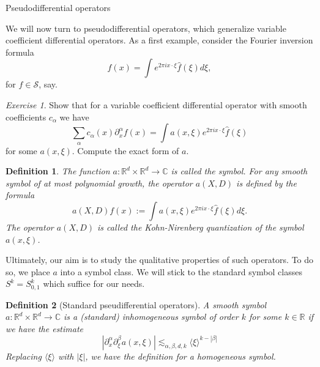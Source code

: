 \documentclass[11pt]{article}
\newtheorem*{defn}{Definition}
\theoremstyle{remark}
\newtheorem{exr}{Exercise}
\newcommand{\calS}{\mathcal{S}}
\newcommand{\1}{\textbf{1}}
\newcommand{\lle}{\lesssim}
\def\brac#1{\langle #1  \rangle}
\newcommand{\bbR}{\mathbb{R}}
\newcommand{\bbC}{\mathbb{C}}
\begin{document}
{\noindent\Large Pseudodifferential operators}
\vspace{6mm}

We will now turn to pseudodifferential operators, which generalize variable coefficient differential operators. As a first example, consider the Fourier inversion formula
\[
f(x) = \int e^{2 \pi i x \cdot \xi} \hat{f}(\xi) d\xi,
\]
for $f \in \calS$, say.
\begin{exr}
Show that for a variable coefficient differential operator with smooth coefficients $c_\alpha$ we have
\[
\sum_\alpha c_\alpha(x) \partial_x^\alpha f(x) = \int a(x,\xi) e^{2 \pi i x \cdot \xi} \hat{f}(\xi)
\]
for some $a(x, \xi)$. Compute the exact form of $a$.
\end{exr}
\begin{defn}
The function $a: \bbR^d \times \bbR^d \to \bbC$ is called the symbol. For any smooth symbol of at most polynomial growth, the operator $a(X,D)$ is defined by the formula
\[
a(X,D) f(x) := \int a(x,\xi) e^{2 \pi i x \cdot \xi} \hat{f}(\xi) d \xi.
\]
The operator $a(X,D)$ is called the Kohn-Nirenberg quantization of the symbol $a(x,\xi)$.
\end{defn}
Ultimately, our aim is to study the qualitative properties of such operators. To do so, we place $a$ into a symbol class. We will stick to the standard symbol classes $S^k = S_{0,1}^k$ which suffice for our needs.
\begin{defn}[Standard pseudifferential operators] A smooth symbol $a:\bbR^d \times \bbR^d \to \bbC$ is a (standard) inhomogeneous symbol of order $k$ for some $k \in \bbR$ if we have the estimate
\[
|\partial_x^\alpha \partial_\xi^\beta a(x,\xi)| \lle_{\alpha,\beta,d,k} \brac{\xi}^{k - |\beta|}
\]
Replacing $\brac{\xi}$ with $|\xi|$, we have the definition for a homogeneous symbol.
\end{defn}
\end{document}
